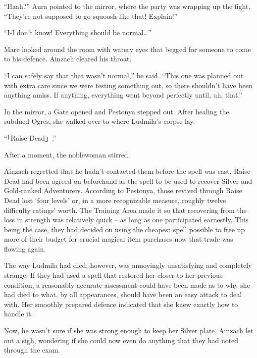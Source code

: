  

“Haah?” Aura pointed to the mirror, where the party was wrapping up the fight, “They’re not supposed to go squoosh like that! Explain!”

 

“I-I don’t know! Everything should be normal…”

 

Mare looked around the room with watery eyes that begged for someone to come to his defence. Ainzach cleared his throat.

 

“I can safely say that that wasn’t normal,” he said. “This one was planned out with extra care since we were testing something out, so there shouldn’t have been anything amiss. If anything, everything went beyond perfectly until, uh, that.”

 

In the mirror, a Gate opened and Pestonya stepped out. After healing the subdued Ogres, she walked over to where Ludmila’s corpse lay.

 

“「Raise Dead」.”

 

After a moment, the noblewoman stirred.

 

Ainzach regretted that he hadn’t contacted them before the spell was cast. Raise Dead had been agreed on beforehand as the spell to be used to recover Silver and Gold-ranked Adventurers. According to Pestonya, those revived through Raise Dead lost ‘four levels’ or, in a more recognizable measure, roughly twelve difficulty ratings’ worth. The Training Area made it so that recovering from the loss in strength was relatively quick – as long as one participated earnestly. This being the case, they had decided on using the cheapest spell possible to free up more of their budget for crucial magical item purchases now that trade was flowing again.

 

The way Ludmila had died, however, was annoyingly unsatisfying and completely strange. If they had used a spell that restored her closer to her previous condition, a reasonably accurate assessment could have been made as to why she had died to what, by all appearances, should have been an easy attack to deal with. Her smoothly prepared defence indicated that she knew exactly how to handle it.

 

Now, he wasn’t sure if she was strong enough to keep her Silver plate. Ainzach let out a sigh, wondering if she could now even do anything that they had noted through the exam.

